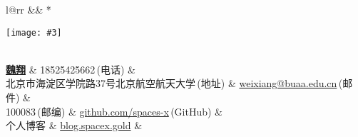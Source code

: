 \newcommand{\paint}[3]{
    \begin{minipage}{#1}
        \texttt{[image: \#3]}
    \end{minipage} 
}
\newcommand{\myheader}{
\begin{tabular*}{\textwidth}{l@{\extracolsep{\fill}}rr}
  && \multirow{4}*{\paint{3.0cm}{4.0cm}{./image.jpg}}\\
  \specialrule{0em}{6pt}{6pt}
  \textbf{\href{http://spaces-x.github.io}{\LARGE 魏翔}} & 18525425662$\,${\color{labelgrey}(电话)} &\\
  北京市海淀区学院路37号北京航空航天大学$\,${\color{labelgrey}(地址)} & \href{mailto:weixiang@buaa.edu.cn}{weixiang@buaa.edu.cn}$\,${\color{labelgrey}(邮件)} & \\
  100083$\,${\color{labelgrey}(邮编)} & \href{https://github.com/spaces-x}{github.com/spaces-x}$\,${\color{labelgrey}(GitHub)} & \\
  个人博客 & \href{http://blog.spacex.gold}{blog.spacex.gold}
  & \\
  
  \end{tabular*}\\\vspace{0.1in}
}

\myheader

